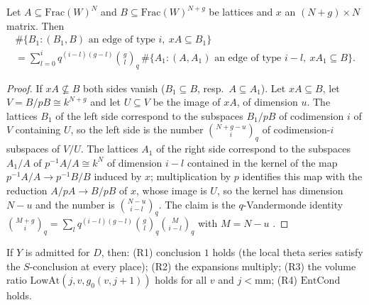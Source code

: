 \begin{lemma}\label{pf:top-shape:countloc}
Let $A\subseteq\mathrm{Frac}(W)^N$ and $B\subseteq\mathrm{Frac}(W)^{N+g}$ be lattices and $x$ an $(N+g)\times N$ matrix. Then
\begin{multline*}
\#\{B_1:(B_1,B)\text{ an edge of type }i,\ xA\subseteq B_1\}\\
=\sum_{l=0}^iq^{(i-l)(g-l)}\binom gl_q\,\#\{A_1:(A,A_1)\text{ an edge of type }i-l,\ xA_1\subseteq B\}.
\end{multline*}
\end{lemma}

\begin{proof}
If $xA\not\subseteq B$ both sides vanish ($B_1\subseteq B$, resp.\ $A\subseteq A_1$). Let $xA\subseteq B$, let $V=B/pB\cong
k^{N+g}$ and let $U\subseteq V$ be the image of $xA$, of dimension $u$. The lattices $B_1$ of the left side correspond to the
subspaces $B_1/pB$ of codimension $i$ of $V$ containing $U$, so the left side is the number $\binom{N+g-u}{i}_q$ of
codimension-$i$ subspaces of $V/U$. The lattices $A_1$ of the right side correspond to the subspaces $A_1/A$ of
$p^{-1}A/A\cong k^N$ of dimension $i-l$ contained in the kernel of the map $p^{-1}A/A\to p^{-1}B/B$ induced by $x$;
multiplication by $p$ identifies this map with the reduction $A/pA\to B/pB$ of $x$, whose image is $U$, so the kernel has
dimension $N-u$ and the number is $\binom{N-u}{i-l}_q$. The claim is the $q$-Vandermonde identity
$\binom{M+g}{i}_q=\sum_lq^{(i-l)(g-l)}\binom gl_q\binom{M}{i-l}_q$ with $M=N-u$ \cite[Thm.~3.4]{Andrews1976}.
\end{proof}

\begin{theorem}\label{pf:top-shape:rests}
If $Y$ is admitted for $D$, then: (R1) conclusion $1$ holds (the local theta series satisfy the $S$-conclusion at every
place); (R2) the expansions multiply; (R3) the volume ratio $\mathrm{LowAt}(j,v,g_0(v,j+1))$ holds for all $v$ and
$j<\mathrm{mm}$; (R4) $\mathrm{EntCond}$ holds.
\end{theorem}

